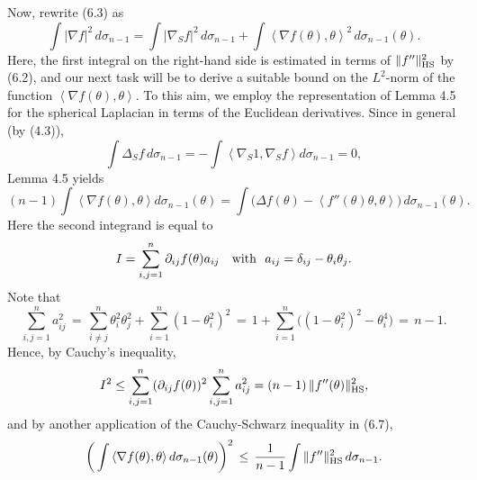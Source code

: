 \documentclass[reqno,12pt]{amsart}
\theoremstyle{plain}
\begin{document}
Now, rewrite (6.3) as
\begin{equation}
\int |\nabla f|^2\,d\sigma_{n-1} =  
\int |\nabla_S f|^2\,d\sigma_{n-1} +
\int \left<\nabla f(\theta),\theta\right>^2\,d\sigma_{n-1}(\theta).
\end{equation}
Here, the first integral on the right-hand side is estimated in terms 
of $\|f''\|_{\rm HS}^2$ by (6.2), and our next task will be to derive 
a suitable bound on the $L^2$-norm of the function 
$\left<\nabla f(\theta),\theta\right>$. 
To this aim, we employ the representation of Lemma 4.5 for
the spherical Laplacian in terms of the Euclidean derivatives.
Since in general (by (4.3)),
$$
\int \Delta_S f\,d\sigma_{n-1} = -
\int \left<\nabla_S 1,\nabla_S f\right> d\sigma_{n-1} = 0,
$$ 
Lemma 4.5 yields
\begin{equation}
(n-1) \int \left<\nabla f(\theta),\theta\right> d\sigma_{n-1}(\theta) =
\int \big(\Delta f(\theta) - 
\left<f''(\theta)\theta,\theta\right>\big)\, d\sigma_{n-1}(\theta).
\end{equation}
Here the second integrand is equal to
$$
I = \sum_{i,j = 1}^n \partial_{ij} f(\theta) a_{ij} \quad {\rm with} \ \
a_{ij} = \delta_{ij} - \theta_i \theta_j.
$$
Note that
$$
\sum_{i,j=1}^n a_{ij}^2 \, = \,
\sum_{i \neq j}^n \theta_i^2 \theta_j^2 + \sum_{i=1}^n (1 - \theta_i^2)^2 \, = \,
1 + \sum_{i=1}^n \big((1 - \theta_i^2)^2 - \theta_i^4\big) \, = \, n-1.
$$
Hence, by Cauchy's inequality,
$$
I^2 \leq \sum_{i,j=1}^n (\partial_{ij} f(\theta))^2 \sum_{i,j=1}^n a_{ij}^2 =
(n-1)\,\|f''(\theta)\|_{{\rm HS}}^2,
$$
and by another application of the Cauchy-Schwarz inequality in (6.7),
\begin{equation}
\bigg(\int \left<\nabla f(\theta),\theta\right> d\sigma_{n-1}(\theta)\bigg)^2
 \, \leq \, \frac{1}{n-1} 
 \int \|f''\|_{\rm HS}^2\,d\sigma_{n-1}.
\end{equation}
\end{document}
